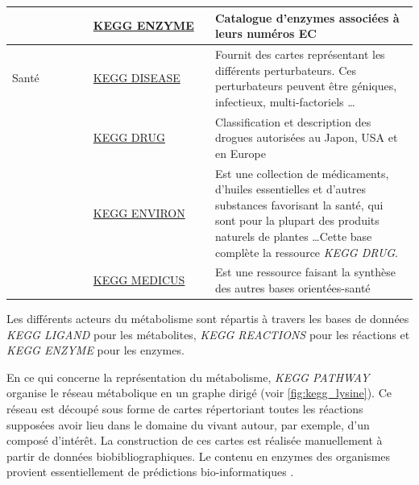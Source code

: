 \begin{refsegment}
\begin{table}[H]
\begin{tabular}{p{0.2\linewidth}|p{0.3\linewidth}|p{0.5\linewidth}}
            \cline{2-3}             & \href{http://www.genome.jp/kegg/annotation/enzyme.html}{KEGG ENZYME}  & Catalogue d'enzymes associées                                                                                                                                                                                                                                                                                               à leurs numéros \acrfull{EC}\\
            \hline
            Santé                   & \href{http://www.genome.jp/kegg/disease/}{KEGG DISEASE}               & Fournit des cartes représentant les différents perturbateurs. Ces perturbateurs peuvent être géniques, infectieux, multi-factoriels \ldots\\
            \cline{2-3}             & \href{http://www.genome.jp/kegg/drug/}{KEGG DRUG}                     & Classification et description des drogues autorisées au Japon, USA et en Europe\\
            \cline{2-3}             & \href{http://www.genome.jp/kegg/drug/environ.html}{KEGG ENVIRON}      & Est une collection de médicaments, d'huiles essentielles et d'autres substances favorisant la santé, qui sont pour la plupart des produits naturels de plantes \ldots Cette base complète la ressource \textit{KEGG DRUG}.\\
            \cline{2-3}             & \href{http://www.genome.jp/kegg/medicus.html}{KEGG MEDICUS}           & Est une ressource faisant la synthèse des autres  bases orientées-santé \\
            \bottomrule
        \end{tabular}
    \end{table}
    
    
    Les différents acteurs du métabolisme sont répartis à travers les bases de données \textit{KEGG LIGAND} pour les métabolites, \textit{KEGG REACTIONS} pour les réactions et \textit{KEGG ENZYME} pour les enzymes.
    
    En ce qui concerne la représentation du métabolisme, \textit{KEGG PATHWAY} organise le réseau métabolique en un graphe dirigé (voir \cref{fig:kegg_lysine}). Ce réseau est découpé sous forme de cartes répertoriant toutes les réactions supposées avoir lieu dans le domaine du vivant autour, par exemple, d’un composé d’intérêt. La construction de ces cartes est réalisée manuellement à partir de données biobibliographiques. Le contenu en enzymes des organismes provient essentiellement de prédictions bio-informatiques .
    

\end{refsegment}
